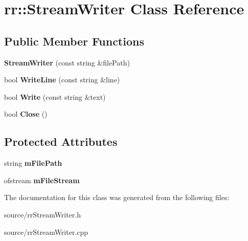 \hypertarget{classrr_1_1_stream_writer}{\section{rr\-:\-:Stream\-Writer Class Reference}
\label{classrr_1_1_stream_writer}
}
\subsection*{Public Member Functions}
\begin{DoxyCompactItemize}
\item 
\hypertarget{classrr_1_1_stream_writer_afb2c9e08adb8752538655849db2f4584}{{\bfseries Stream\-Writer} (const string \&file\-Path)}\label{classrr_1_1_stream_writer_afb2c9e08adb8752538655849db2f4584}

\item 
\hypertarget{classrr_1_1_stream_writer_a12aaf8af2059a2f623b6df3758e3bac2}{bool {\bfseries Write\-Line} (const string \&line)}\label{classrr_1_1_stream_writer_a12aaf8af2059a2f623b6df3758e3bac2}

\item 
\hypertarget{classrr_1_1_stream_writer_a6c95209706ab929dd54336a4e3f42a4c}{bool {\bfseries Write} (const string \&text)}\label{classrr_1_1_stream_writer_a6c95209706ab929dd54336a4e3f42a4c}

\item 
\hypertarget{classrr_1_1_stream_writer_a5635129b4b4139d7444e0d4cea40f2c3}{bool {\bfseries Close} ()}\label{classrr_1_1_stream_writer_a5635129b4b4139d7444e0d4cea40f2c3}

\end{DoxyCompactItemize}
\subsection*{Protected Attributes}
\begin{DoxyCompactItemize}
\item 
\hypertarget{classrr_1_1_stream_writer_a09798bb4b0d42f24868e7aa04b82dbda}{string {\bfseries m\-File\-Path}}\label{classrr_1_1_stream_writer_a09798bb4b0d42f24868e7aa04b82dbda}

\item 
\hypertarget{classrr_1_1_stream_writer_a49984b0c89a8078bb7b32b5a40bd7403}{ofstream {\bfseries m\-File\-Stream}}\label{classrr_1_1_stream_writer_a49984b0c89a8078bb7b32b5a40bd7403}

\end{DoxyCompactItemize}


The documentation for this class was generated from the following files\-:\begin{DoxyCompactItemize}
\item 
source/rr\-Stream\-Writer.\-h\item 
source/rr\-Stream\-Writer.\-cpp\end{DoxyCompactItemize}
